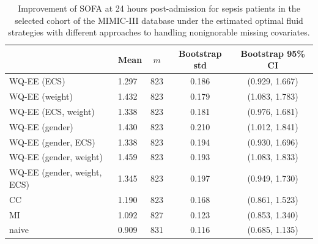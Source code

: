 \documentclass[12pt]{article}
\begin{document}
\begin{table}[htbp]
\caption{Improvement of SOFA at 24 hours post-admission for sepsis patients in the selected cohort of  the MIMIC-III database under the estimated optimal fluid strategies with different approaches to handling nonignorable missing covariates.}\label{RDAtable1}
  \centering
  \begin{threeparttable}
    \begin{tabular}{llccc}
    \hline
     & Mean & $m$ & Bootstrap std & Bootstrap 95\% CI \\
    \hline 
    WQ-EE (ECS)    &  1.297  & 823 & 0.186 & (0.929, 1.667) \\
    WQ-EE (weight)   & 1.432  & 823 & 0.179 &  (1.083, 1.783) \\
    WQ-EE (ECS, weight)   & 1.338 & 823 & 0.181 & (0.976, 1.681) \\
    WQ-EE (gender)   & 1.430 & 823 &  0.210 & (1.012, 1.841) \\
    WQ-EE (gender, ECS)   & 1.338  & 823 & 0.194 &  (0.930, 1.696)\\
    WQ-EE (gender, weight)    & 1.459 & 823 & 0.193 & (1.083, 1.833) \\
    WQ-EE (gender, weight, ECS)    & 1.345 & 823 & 0.197 & (0.949, 1.730)  \\
    CC &  1.190  & 823 &  0.168  &  (0.861, 1.523)     \\
    MI &  1.092  & 827 &  0.123  &  (0.853, 1.340)     \\
    naive &  0.909 & 831 & 0.116   & (0.685, 1.135)  \\

\end{tabular}
\end{threeparttable}
\end{table}
\end{document}

